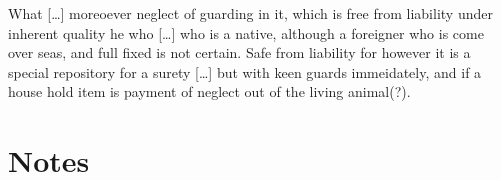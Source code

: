 \documentclass[11pt]{article}
\begin{document}
\begin{pages}
\begin{Leftside}
    \pstart

    \pend
    \endnumbering
  \end{Leftside}

  \begin{Rightside}
    \beginnumbering
   \pstart
   What [\ldots{}] moreoever neglect of guarding in it, which is free from liability under inherent quality he who [\ldots{}] who is a native, although a foreigner who is come over seas, and full fixed is not certain.  Safe from liability for however it is a special repository for a surety [\ldots{}] but with keen guards immeidately, and if a house hold item is payment of neglect out of the living animal(?). 
     \pend

     \pstart
     \pend
    \endnumbering
  \end{Rightside}
  \Pages


\end{pages}

\section{Notes}
\end{document}
